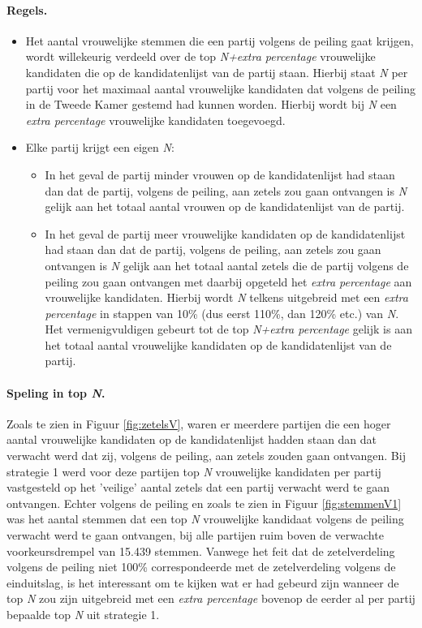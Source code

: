 \paragraph{Regels.}
\begin{itemize}
	\item
Het aantal vrouwelijke stemmen die een partij volgens de peiling gaat krijgen, wordt willekeurig verdeeld over de top \textit{N+extra percentage} vrouwelijke kandidaten die op de kandidatenlijst van de partij staan. Hierbij staat \textit{N} per partij voor het maximaal aantal vrouwelijke kandidaten dat volgens de peiling in de Tweede Kamer gestemd had kunnen worden. Hierbij wordt bij \textit{N} een \textit{extra percentage} vrouwelijke kandidaten toegevoegd.\\
 	\item
Elke partij krijgt een eigen \textit{N}:
	\begin{itemize}
		\item
In het geval de partij minder vrouwen op de kandidatenlijst had staan dan dat de partij, volgens de peiling, aan zetels zou gaan ontvangen is \textit{N} gelijk aan het totaal aantal vrouwen op de kandidatenlijst van de partij.
		\item
In het geval de partij meer vrouwelijke kandidaten op de kandidatenlijst had staan dan dat de partij, volgens de peiling, aan zetels zou gaan ontvangen is \textit{N} gelijk aan het totaal aantal zetels die de partij volgens de peiling zou gaan ontvangen met daarbij opgeteld het \textit{extra percentage} aan vrouwelijke kandidaten. Hierbij wordt \textit{N} telkens uitgebreid met een \textit{extra percentage} in stappen van 10\% (dus eerst 110\%, dan 120\% etc.) van \textit{N}. Het vermenigvuldigen gebeurt tot de top \textit{N+extra percentage} gelijk is aan het totaal aantal vrouwelijke kandidaten op de kandidatenlijst van de partij. 
\end{itemize} 	
\end{itemize}

\paragraph{Speling in top \textit{N}.}
Zoals te zien in Figuur \ref{fig:zetelsV}, waren er meerdere partijen die een hoger aantal vrouwelijke kandidaten op de kandidatenlijst hadden staan dan dat verwacht werd dat zij,  volgens de peiling, aan zetels zouden gaan ontvangen. Bij strategie 1 werd voor deze partijen top \textit{N} vrouwelijke kandidaten per partij vastgesteld op het 'veilige' aantal zetels dat een partij verwacht werd te gaan ontvangen. Echter volgens de peiling en zoals te zien in Figuur \ref{fig:stemmenV1} was het aantal stemmen dat een top \textit{N} vrouwelijke kandidaat volgens de peiling verwacht werd te gaan ontvangen, bij alle partijen ruim boven de verwachte voorkeursdrempel van 15.439 stemmen. Vanwege het feit dat de zetelverdeling volgens de peiling niet 100\% correspondeerde met de zetelverdeling volgens de einduitslag, is het interessant om te kijken wat er had gebeurd zijn wanneer de top \textit{N} zou zijn uitgebreid met een \textit{extra percentage} bovenop de eerder al per partij bepaalde top \textit{N} uit strategie 1. 

